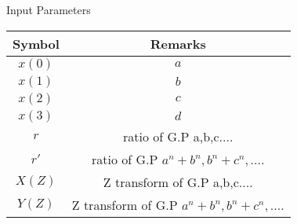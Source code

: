 \setlength{\arrayrulewidth}{0.3mm}
\setlength{\tabcolsep}{12pt}
\renewcommand{\arraystretch}{1.5}


\begin{center}
\caption{Input Parameters}
\begin{tabular}{|c|c|}

\hline
 {Symbol}&{Remarks}\\
\hline
$x(0) $ & $a$ \\
\hline
$x(1) $ & $b$ \\
\hline
$x(2) $ & $c$ \\
\hline
$x(3) $ & $d$ \\
\hline
$r$ & ratio of G.P a,b,c....\\
\hline
$r'$ & ratio of G.P $a^n + b^n,b^n + c^n,....$\\
\hline
$X(Z)$ & Z transform of G.P a,b,c....\\
\hline
$Y(Z)$ & Z transform of G.P $a^n + b^n,b^n + c^n,....$\\
\hline

\end{tabular}
\end{center}
